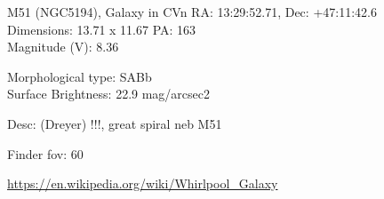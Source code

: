 \begin{block}{M51 (NGC5194), Galaxy in CVn}
    RA: 13:29:52.71, Dec: +47:11:42.6 \\ 
    Dimensions: 13.71 x 11.67 PA: 163 \\ 
    Magnitude (V): 8.36

    Morphological type: SABb \\ 
    Surface Brightness: 22.9 mag/arcsec2 

    Desc: (Dreyer) !!!, great spiral neb M51 

    Finder fov: 60 

    \url{https://en.wikipedia.org/wiki/Whirlpool_Galaxy} 
\end{block}